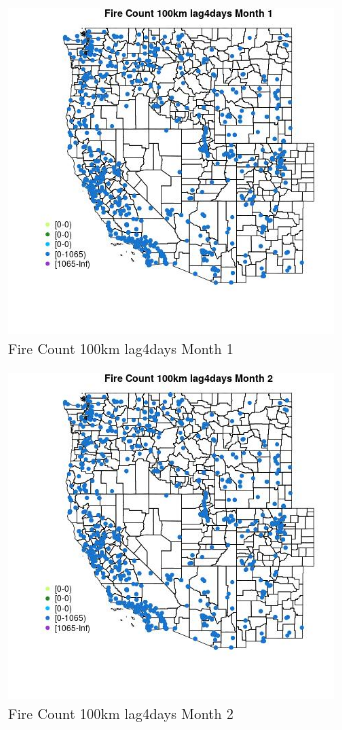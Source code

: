 \begin{figure} 
\centering  
\includegraphics[width=0.77\textwidth]{Code_Outputs/Report_ML_input_PM25_Step4_part_f_de_duplicated_aveswNAs_MapObsMo1Fire_Count_100km_lag4days.jpg} 
\caption{\label{fig:Report_ML_input_PM25_Step4_part_f_de_duplicated_aveswNAsMapObsMo1Fire_Count_100km_lag4days}Fire Count 100km lag4days Month 1} 
\end{figure} 
 

\clearpage 

\begin{figure} 
\centering  
\includegraphics[width=0.77\textwidth]{Code_Outputs/Report_ML_input_PM25_Step4_part_f_de_duplicated_aveswNAs_MapObsMo2Fire_Count_100km_lag4days.jpg} 
\caption{\label{fig:Report_ML_input_PM25_Step4_part_f_de_duplicated_aveswNAsMapObsMo2Fire_Count_100km_lag4days}Fire Count 100km lag4days Month 2} 
\end{figure} 
 

